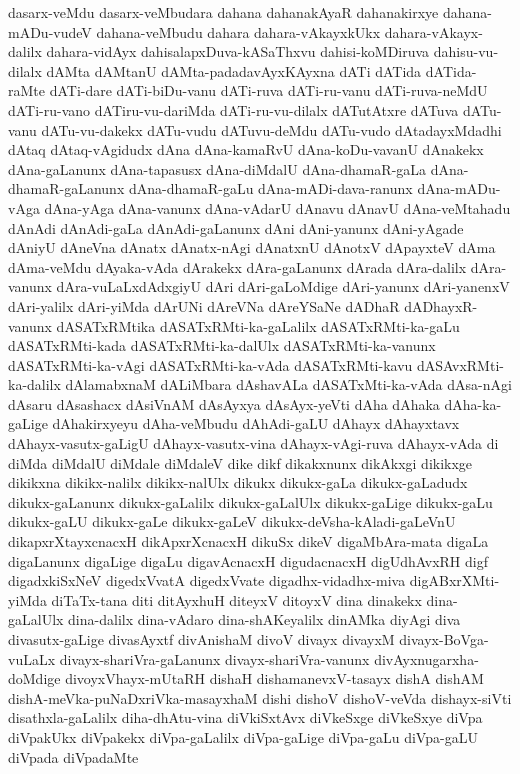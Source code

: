 {dasarx-veMdu
dasarx-veMbudara
dahana
dahanakAyaR
dahanakirxye
dahana-mADu-vudeV
dahana-veMbudu
dahara
dahara-vAkayxkUkx
dahara-vAkayx-dalilx
dahara-vidAyx
dahisalapxDuva-kASaThxvu
dahisi-koMDiruva
dahisu-vu-dilalx
dAMta
dAMtanU
dAMta-padadavAyxKAyxna
dATi
dATida
dATida-raMte
dATi-dare
dATi-biDu-vanu
dATi-ruva
dATi-ru-vanu
dATi-ruva-neMdU
dATi-ru-vano
dATiru-vu-dariMda
dATi-ru-vu-dilalx
dATutAtxre
dATuva
dATu-vanu
dATu-vu-dakekx
dATu-vudu
dATuvu-deMdu
dATu-vudo
dAtadayxMdadhi
dAtaq
dAtaq-vAgidudx
dAna
dAna-kamaRvU
dAna-koDu-vavanU
dAnakekx
dAna-gaLanunx
dAna-tapasusx
dAna-diMdalU
dAna-dhamaR-gaLa
dAna-dhamaR-gaLanunx
dAna-dhamaR-gaLu
dAna-mADi-dava-ranunx
dAna-mADu-vAga
dAna-yAga
dAna-vanunx
dAna-vAdarU
dAnavu
dAnavU
dAna-veMtahadu
dAnAdi
dAnAdi-gaLa
dAnAdi-gaLanunx
dAni
dAni-yanunx
dAni-yAgade
dAniyU
dAneVna
dAnatx
dAnatx-nAgi
dAnatxnU
dAnotxV
dApayxteV
dAma
dAma-veMdu
dAyaka-vAda
dArakekx
dAra-gaLanunx
dArada
dAra-dalilx
dAra-vanunx
dAra-vuLaLxdAdxgiyU
dAri
dAri-gaLoMdige
dAri-yanunx
dAri-yanenxV
dAri-yalilx
dAri-yiMda
dArUNi
dAreVNa
dAreYSaNe
dADhaR
dADhayxR-vanunx
dASATxRMtika
dASATxRMti-ka-gaLalilx
dASATxRMti-ka-gaLu
dASATxRMti-kada
dASATxRMti-ka-dalUlx
dASATxRMti-ka-vanunx
dASATxRMti-ka-vAgi
dASATxRMti-ka-vAda
dASATxRMti-kavu
dASAvxRMti-ka-dalilx
dAlamabxnaM
dALiMbara
dAshavALa
dASATxMti-ka-vAda
dAsa-nAgi
dAsaru
dAsashacx
dAsiVnAM
dAsAyxya
dAsAyx-yeVti
dAha
dAhaka
dAha-ka-gaLige
dAhakirxyeyu
dAha-veMbudu
dAhAdi-gaLU
dAhayx
dAhayxtavx
dAhayx-vasutx-gaLigU
dAhayx-vasutx-vina
dAhayx-vAgi-ruva
dAhayx-vAda
di
diMda
diMdalU
diMdale
diMdaleV
dike
dikf
dikakxnunx
dikAkxgi
dikikxge
dikikxna
dikikx-nalilx
dikikx-nalUlx
dikukx
dikukx-gaLa
dikukx-gaLadudx
dikukx-gaLanunx
dikukx-gaLalilx
dikukx-gaLalUlx
dikukx-gaLige
dikukx-gaLu
dikukx-gaLU
dikukx-gaLe
dikukx-gaLeV
dikukx-deVsha-kAladi-gaLeVnU
dikapxrXtayxcnacxH
dikApxrXcnacxH
dikuSx
dikeV
digaMbAra-mata
digaLa
digaLanunx
digaLige
digaLu
digavAcnacxH
digudacnacxH
digUdhAvxRH
digf
digadxkiSxNeV
digedxVvatA
digedxVvate
digadhx-vidadhx-miva
digABxrXMti-yiMda
diTaTx-tana
diti
ditAyxhuH
diteyxV
ditoyxV
dina
dinakekx
dina-gaLalUlx
dina-dalilx
dina-vAdaro
dina-shAKeyalilx
dinAMka
diyAgi
diva
divasutx-gaLige
divasAyxtf
divAnishaM
divoV
divayx
divayxM
divayx-BoVga-vuLaLx
divayx-shariVra-gaLanunx
divayx-shariVra-vanunx
divAyxnugarxha-doMdige
divoyxVhayx-mUtaRH
dishaH
dishamanevxV-tasayx
dishA
dishAM
dishA-meVka-puNaDxriVka-masayxhaM
dishi
dishoV
dishoV-veVda
dishayx-siVti
disathxla-gaLalilx
diha-dhAtu-vina
diVkiSxtAvx
diVkeSxge
diVkeSxye
diVpa
diVpakUkx
diVpakekx
diVpa-gaLalilx
diVpa-gaLige
diVpa-gaLu
diVpa-gaLU
diVpada
diVpadaMte
}

